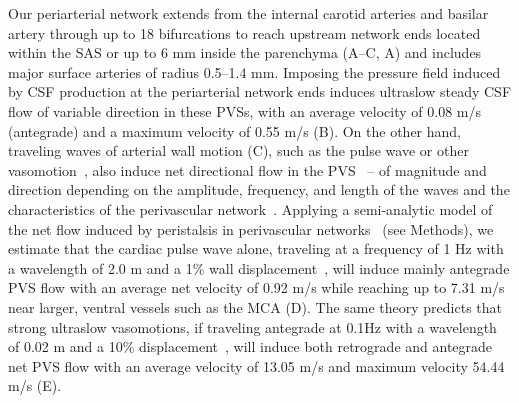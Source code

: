 \documentclass[fleqn,10pt]{wlscirep}
\begin{document}
Our periarterial network extends from the internal carotid arteries
and basilar artery through up to 18 bifurcations to reach upstream
network ends located within the SAS or up to 6 mm inside the
parenchyma (A--C, A) and includes
major surface arteries of radius 0.5--1.4 mm. Imposing the pressure
field induced by CSF production at the periarterial network ends
induces ultraslow steady CSF flow of variable direction in these PVSs,
with an average velocity of 0.08 \textmu m/s (antegrade) and a maximum
velocity of 0.55 \textmu m/s (B). On the other hand,
traveling waves of arterial wall motion (C), such as the
pulse wave or other vasomotion~\cite{vanveluw2020vasomotion,
  munting2023spontaneous, bojarskaite2023sleep, broggini2024long,hauglund2025norepinephrine},
also induce net directional flow in the
PVS~\cite{kedarasetti2020arterial, kedarasetti2020functional,
  coenen2021lubrication, gjerde2023directional, nozaleda2024arterial}
-- of magnitude and direction depending on the amplitude, frequency,
and length of the waves and the characteristics of the perivascular
network~\cite{gjerde2023directional}. Applying a
semi-analytic model of the net flow induced by peristalsis in
perivascular networks~\cite{gjerde2023directional} (see Methods), we
estimate that the cardiac pulse wave alone, traveling at a frequency
of 1 Hz with a wavelength of 2.0 m and a 1\% wall
displacement~\cite{jung2021novel}, will induce mainly antegrade PVS
flow with an average net velocity of 0.92 \textmu m/s while reaching up
to 7.31 \textmu m/s near larger, ventral vessels such as the MCA
(D). The same theory predicts that strong ultraslow
vasomotions, if traveling antegrade at 0.1Hz with a wavelength of 0.02
m and a 10\% displacement~\cite{broggini2024long}, will induce both
retrograde and antegrade net PVS flow with an average velocity of
13.05 \textmu m/s and maximum velocity 54.44 \textmu m/s
(E).
\end{document}
